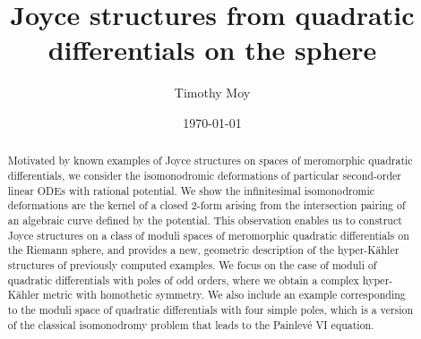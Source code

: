 \documentclass[a4paper,12pt,reqno]{amsart}
\numberwithin{equation}{section}
\numberwithin{counter2}{section}
\begin{document}
\title{Joyce structures from quadratic differentials on the sphere}


\author{Timothy Moy}
\address{Department of Applied Mathematics and Theoretical Physics\\ 
University of Cambridge\\ Wilberforce Road, Cambridge CB3 0WA, UK.}
\date{\today}

\begin{abstract}
Motivated by known examples of Joyce structures on spaces of meromorphic quadratic differentials,  we consider the isomonodromic deformations of particular second-order linear ODEs with rational potential.  We show the infinitesimal isomonodromic deformations are the kernel of a closed $2$-form arising from the intersection pairing of an algebraic curve defined by the potential.  
This observation enables us to construct Joyce structures on a class of moduli spaces of meromorphic quadratic differentials on the Riemann sphere,  and provides a new,  geometric description of the hyper-K\"ahler structures of previously computed examples.  We focus on the case of moduli of quadratic differentials with poles of odd orders,  where we obtain a complex hyper-K\"ahler metric with homothetic symmetry.   We also include an example corresponding to the moduli space of quadratic differentials with four simple poles,  which is a version of the classical isomonodromy problem that leads to the Painlev\'{e} VI equation.  
\end{abstract}

\maketitle
\end{document}
